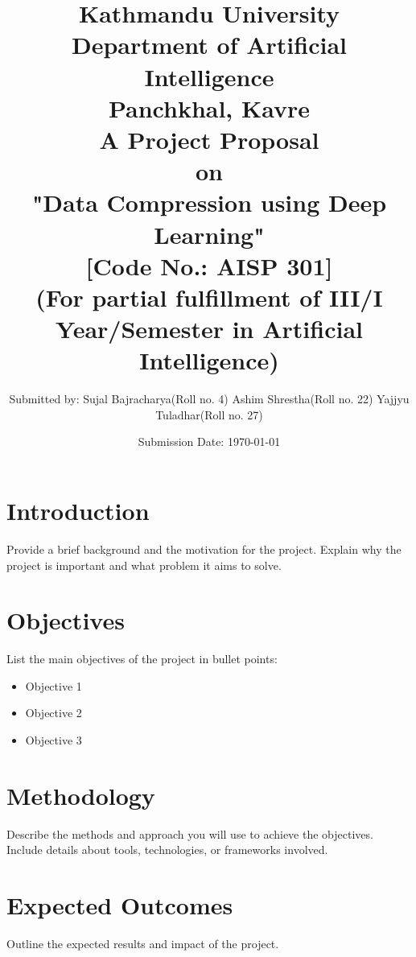 \documentclass[a4paper,12pt]{article}
\title{
\textbf{
    Kathmandu University \\
    \large{Department of Artificial Intelligence}\\
    \normalsize{Panchkhal, Kavre}\\[2cm]}
    \normalsize{A Project Proposal\\on\\
    \textbf{"Data Compression using Deep Learning"}}\\[0.5cm]
    \normalsize{[Code No.: AISP 301]\\
    (For partial fulfillment of III/I Year/Semester in Artificial Intelligence)}\\[2cm]
}
\author[ ]{\normalsize{
        Submitted by: \linebreak
        Sujal Bajracharya(Roll no. 4)\linebreak
        Ashim Shrestha(Roll no. 22)\linebreak
        Yajjyu Tuladhar(Roll no. 27)
}}
\affil[ ]{\vspace{1.5cm}}
\affil[ ]{\normalsize{
        Submitted to: \linebreak
        Subodh Acharya \linebreak
        Department of Artificial Intelligence
}}
\affil[ ]{}
\date{\normalsize{Submission Date: \today}}
\begin{document}
\maketitle
\thispagestyle{empty}
\restoregeometry

\newpage
\setcounter{page}{1}

\section{Introduction}
Provide a brief background and the motivation for the project. Explain why the project is important and what problem it aims to solve.

\section{Objectives}
List the main objectives of the project in bullet points:
\begin{itemize}
    \item Objective 1
    \item Objective 2
    \item Objective 3
\end{itemize}

\section{Methodology}
Describe the methods and approach you will use to achieve the objectives. Include details about tools, technologies, or frameworks involved.

\section{Expected Outcomes}
Outline the expected results and impact of the project.
\end{document}
